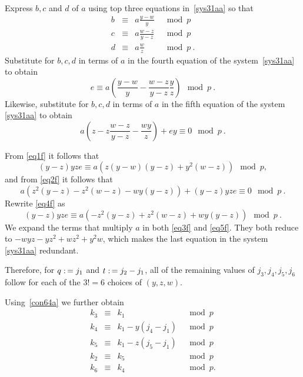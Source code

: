 Express $b,c$ and $d$ of $a$ using top three  equations
in~\eqref{sys31aa} so that
\begin{equation}\begin{array}{llll}
b &\equiv& a \frac{y-w}{y} &\mod p \\
c &\equiv& a \frac{w-z}{y-z} &\mod p\\
d &\equiv& a \frac{w}{z} &\mod p~.
\end{array}
\end{equation}
Substitute for $b,c,d$ in terms of $a$ in the fourth equation of the
system~\eqref{sys31aa} to obtain \begin{equation}\label{eq1f} e
\equiv a (\frac{y-w}{y}-\frac{w-z}{y-z}\frac{y}{z}) \mod p~.
\end{equation}
Likewise, substitute for $b,c,d$ in terms of $a$ in the fifth
equation of the system \eqref{sys31aa} to obtain
\begin{equation}\label{eq2f} a\left(z-z\frac{w-z}{y-z}-\frac{wy}{z}
\right) +ey \equiv 0 \mod p~.
\end{equation}

From \eqref{eq1f} it follows that
\begin{equation}\label{eq3f}
(y-z)yze \equiv a \left( z(y-w)(y-z)+y^2(w-z) \right) \mod p,
\end{equation}
and from \eqref{eq2f} it follows that
\begin{equation}\label{eq4f}
a \left( z^2(y-z)-z^2(w-z)-wy(y-z) \right) +(y-z)yze \equiv 0 \mod
p~.
\end{equation}
Rewrite \eqref{eq4f} as
\begin{equation}\label{eq5f}
(y-z)yze \equiv a \left( -z^2(y-z)+z^2(w-z)+wy(y-z) \right)  \mod
p~.
\end{equation}
 We expand the terms that multiply $a$ in both \eqref{eq3f}
and \eqref{eq5f}. They both reduce to $-wyz-yz^2+wz^2+y^2w$, which
makes the last equation in the system \eqref{sys31aa} redundant.


Therefore, for $q \asn j_1$ and $t \asn j_2-j_1$, all of the
remaining values of $j_3,j_4,j_5,j_6$ follow for each of the $3!=6$
choices of $(y,z,w)$.

Using~\eqref{con64a} we further obtain
\begin{equation}\begin{array}{ccccc}
k_3 & \equiv& k_1 &\mod p\\
k_4 & \equiv& k_1-y(j_4-j_1) &\mod p\\
k_5 &\equiv& k_1-z(j_5-j_1) &\mod p\\
k_2 &\equiv& k_5 &\mod p\\
k_6 &\equiv& k_4 &\mod p. \end{array}\end{equation}

